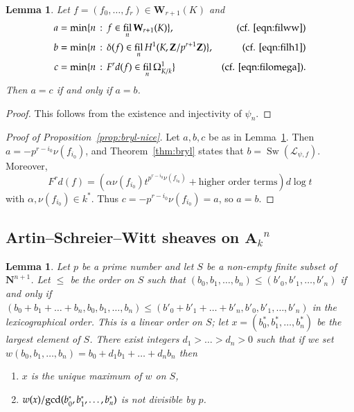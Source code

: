 \documentclass[twoside]{amsart}
\renewcommand{\AA}{\mathbf{A}}
\newcommand{\NN}{\mathbf{N}}
\newcommand{\WW}{\mathbf{W}}
\newcommand{\ZZ}{\mathbf{Z}}
\newcommand{\Ll}{\mathscr{L}}
\DeclareMathOperator{\Swan}{Sw}
\DeclareMathOperator{\fil}{fil}
\DeclareMathOperator{\Gr}{Gr}
\newcommand{\ANK}[2]{{\AA_{#2}}^{\! \! \! \!  #1}} %
\newcommand{\AN}[1]{\ANK{#1}{k}}
\theoremstyle{plain}
\newtheorem{lemma}[subsubsection]{Lemma}
\theoremstyle{definition}
\theoremstyle{remark}
\numberwithin{equation}{subsection}
\begin{document}
\begin{lemma} \label{lemma:abc}
	Let $f=(f_0, \ldots,f_r)\in \WW_{r+1}(K)$ and 
	\begin{align*}
		a &= \min\{ n\,:\, f\in \fil_n \WW_{r+1}(K) \},  & \text{(cf. \eqref{eqn:filww})}\\
		b &= \min\{ n\,:\, \delta(f)\in \fil_n H^1(K, \ZZ/p^{r+1}\ZZ) \},& \text{(cf. \eqref{eqn:filh1})}\\
		c &= \min\{ n\,:\, F^r d (f)\in \fil_n \Omega^1_{K/k}\} & \text{(cf. \eqref{eqn:filomega})}.
	\end{align*}
	Then $a=c$ if and only if $a=b$.
\end{lemma}

\begin{proof}
This follows from the existence and injectivity of $\psi_n$. %
\end{proof}

\begin{proof}[Proof of Proposition~\ref{prop:bryl-nice}]
	Let $a,b,c$ be as in Lemma~\ref{lemma:abc}. Then $a = -p^{r-i_0}\nu(f_{i_0})$, and Theorem~\ref{thm:bryl} states that $b=\Swan(\Ll_{\psi, f})$. Moreover, 
	\[ 
		F^rd(f) = \left( \alpha\nu(f_{i_0})t^{p^{r-i_0}\nu(f_{i_0})} + \text{higher order terms}\right) d\log t
	\]
	with $\alpha, \nu(f_{i_0})\in k^*$. Thus $c=-p^{r-i_0}\nu(f_{i_0})=a$, so $a=b$.
\end{proof}

\subsection{Artin--Schreier--Witt sheaves on $\AN n$}

\begin{lemma} \label{lemma:uniqmax}
	Let $p$ be a prime number and let $S$ be a non-empty finite subset of $\NN^{n+1}$. Let $\leq$ be the order on $S$ such that $(b_0, b_1, \ldots, b_n)\leq (b'_0, b'_1, \ldots, b'_n)$ if and only if $(b_0+b_1+\ldots+b_n, b_0, b_1, \ldots, b_n)\leq (b'_0+b'_1+\ldots+b'_n, b'_0, b'_1, \ldots, b'_n)$ in the lexicographical order. This is a linear order on $S$; let $x=(b^*_0, b_1^*, \ldots, b_n^*)$ be the largest element of $S$. There exist integers $d_1>\ldots>d_n>0$ such that if we set $w(b_0, b_1, \ldots, b_n) = b_0 + d_1 b_1 + \ldots + d_n b_n$ then
	\begin{enumerate}
  		\item $x$ is the unique maximum of $w$ on $S$,
  		\item $w(x)/{\rm gcd}(b_0^*, b_1^*, \ldots, b_n^*)$ is not divisible by $p$.
 	\end{enumerate}  
\end{lemma}
\end{document}
